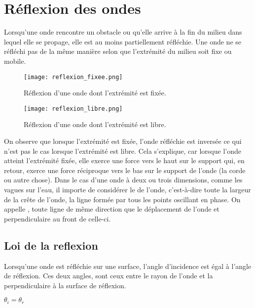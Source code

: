 \section{Réflexion des ondes}
Lorsqu'une onde rencontre un obstacle ou qu'elle arrive à la fin du milieu dans lequel elle se propage, elle est au moins partiellement réfléchie.
Une onde ne se réfléchi pas de la même manière selon que l'extrémité du milieu soit fixe ou mobile.
\begin{figure}[ht]
    \begin{minipage}{.5\textwidth}
        \centering
        \texttt{[image: reflexion\_fixee.png]}
        \caption{Réflexion d'une onde dont l'extrémité est fixée.}
    \end{minipage}
    \begin{minipage}{.5\textwidth}
        \centering
        \texttt{[image: reflexion\_libre.png]}
        \caption{Réflexion d'une onde dont l'extrémité est libre.}
    \end{minipage}
\end{figure}
On observe que lorsque l'extrémité est fixée, l'onde réfléchie est inversée ce qui n'est pas le cas lorsque l'extrémité est libre. Cela s'explique, car lorsque l'onde atteint l'extrémité fixée, elle exerce une force vers le haut sur le support qui, en retour, exerce une force réciproque vers le bas sur le support de l'onde (la corde ou autre chose).
Dans le cas d'une onde à deux ou trois dimensions, comme les vagues sur l'eau, il importe de considérer le  de l'onde, c'est-à-dire toute la largeur de la crête de l'onde, la ligne formée par tous les points oscillant en phase.
On appelle , toute ligne de même direction que le déplacement de l'onde et perpendiculaire au front de celle-ci.

\newpage

\subsection{Loi de la reflexion}
Lorsqu'une onde est réfléchie sur une surface, l'angle d'incidence est égal à l'angle de réflexion. Ces deux angles, sont ceux entre le rayon de l'onde et la perpendiculaire à la surface de réflexion.
\begin{encadre}
    \(\theta_i = \theta_r\)
\end{encadre}


